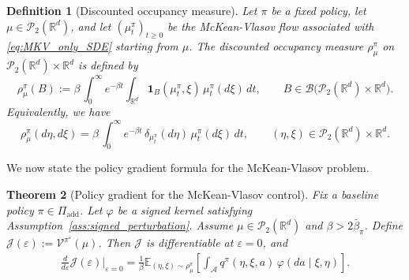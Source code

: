\documentclass[a4paper, 10pt, english, reqno]{amsart}
\newtheorem{theorem}{Theorem}[section]
\newtheorem{definition}[theorem]{Definition}
\begin{document}
\begin{definition}[Discounted occupancy measure]\label{def:discounted_ocupacy_MKV}
Let $\pi$ be a fixed policy, let $\mu\in\mathcal P_2(\mathbb R^d)$, and
let $(\mu_t^\pi)_{t\ge0}$ be the McKean-Vlasov flow associated with
\eqref{eq:MKV_only_SDE} starting from $\mu$. The discounted occupancy
measure $\rho_\mu^\pi$ on $\mathcal P_2(\mathbb R^d)\times\mathbb R^d$ is
defined by
\[
\rho_\mu^\pi(B)
:=\beta\,
\int_0^\infty e^{-\beta t}
\int_{\mathbb R^d}
\mathbf 1_{B}(\mu_t^\pi,\xi)\,\mu_t^\pi(d\xi)\,dt,
\qquad
B\in\mathcal B\bigl(\mathcal P_2(\mathbb R^d)\times\mathbb R^d\bigr).
\]
Equivalently, we have 
\[
\rho_\mu^\pi(d\eta,d\xi)
=\beta\,
\int_0^\infty e^{-\beta t}\,
\delta_{\mu_t^\pi}(d\eta)\,
\mu_t^\pi(d\xi)\,dt,
\qquad
(\eta,\xi)\in \mathcal P_2(\mathbb R^d)\times\mathbb R^d .
\]
\end{definition}



We now state the policy gradient formula for the McKean-Vlasov
problem.

\begin{theorem}[Policy gradient for the McKean-Vlasov control]
\label{cor:policy-gradient-mkv}
Fix a baseline policy $\pi\in\Pi_{\mathrm{add}}$. Let $\varphi$ be a signed kernel satisfying
Assumption~\ref{ass:signed_perturbation}. Assume $\mu\in\mathcal{P}_2(\mathbb{R}^d)$ and $\beta>2\bar\beta_\pi$. Define
$\mathcal J(\varepsilon):=\mathcal V^{\pi^\varepsilon}(\mu)$. Then
$\mathcal J$ is differentiable at $\varepsilon=0$, and
\begin{align}\label{eq:gateaux-pg-mkv}
    \frac{d}{d\varepsilon}\mathcal J(\varepsilon)\bigg|_{\varepsilon=0}
=  \frac{1}{\beta}
\mathbb E_{(\eta,\xi)\sim\rho_\mu^\pi}\!\left[
\int_{\mathcal A}
q^\pi(\eta,\xi,a)\,
\varphi(da\mid\xi,\eta)
\right].
\end{align}
\end{theorem}
\end{document}
